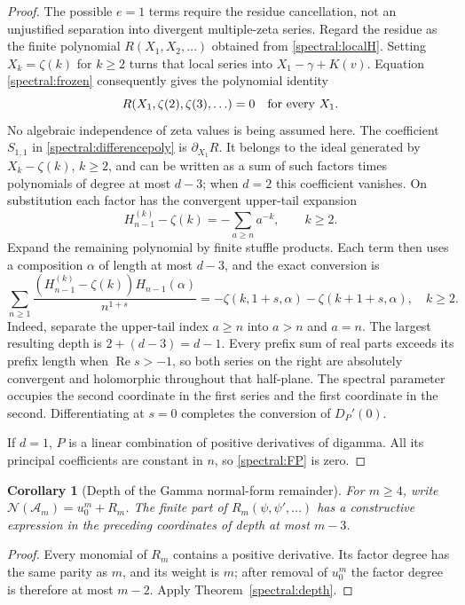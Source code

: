 \documentclass[11pt,a4paper]{article}
\numberwithin{equation}{section}
\newtheorem{corollary}[theorem]{Corollary}
\theoremstyle{definition}
\theoremstyle{remark}
\newcommand{\re}{\operatorname{Re}}
\newcommand{\A}{\mathcal A}
\newcommand{\NN}{\mathcal N}
\begin{document}
\begin{proof}
The possible $e=1$ terms require the residue cancellation, not an
unjustified separation into divergent multiple-zeta series.  Regard the
residue as the finite polynomial $R(X_1,X_2,\ldots)$ obtained from
\eqref{spectral:localH}.  Setting $X_k=\zeta(k)$ for $k\geq2$ turns that
local series into $X_1-\gamma+K(v)$.  Equation
\eqref{spectral:frozen} consequently gives the polynomial identity
\[
 R(X_1,\zeta(2),\zeta(3),\ldots)=0
 \quad\hbox{for every }X_1.
\]
No algebraic independence of zeta values is being assumed here.
The coefficient $S_{1,1}$ in \eqref{spectral:differencepoly} is
$\partial_{X_1}R$.  It belongs to the ideal generated by
$X_k-\zeta(k)$, $k\geq2$, and can be written as a sum of such factors
times polynomials of degree at most $d-3$; when $d=2$ this coefficient
vanishes.  On substitution each factor
has the convergent upper-tail expansion
\[
 H_{n-1}^{(k)}-\zeta(k)=-\sum_{a\geq n}a^{-k},\qquad k\geq2.
\]
Expand the remaining polynomial by finite stuffle products.  Each term
then uses a composition $\alpha$ of length at most $d-3$, and the exact
conversion is
\begin{equation}\label{spectral:tailconversion}
 \boxed{\displaystyle
 \sum_{n\geq1}\frac{(H_{n-1}^{(k)}-\zeta(k))H_{n-1}(\alpha)}{n^{1+s}}
     =-\zeta(k,1+s,\alpha)-\zeta(k+1+s,\alpha),\quad k\geq2.}
\end{equation}
Indeed, separate the upper-tail index $a\geq n$ into $a>n$ and $a=n$.
The largest resulting depth is $2+(d-3)=d-1$.  Every prefix sum of
real parts exceeds its prefix length when $\re s>-1$, so both series
on the right are absolutely convergent and holomorphic throughout that
half-plane.  The spectral parameter occupies the second coordinate in
the first series and the first coordinate in the second.  Differentiating
at $s=0$ completes the conversion of $D_P'(0)$.

If $d=1$, $P$ is a linear combination of positive derivatives of
digamma.  All its principal coefficients are constant in $n$, so
\eqref{spectral:FP} is zero.
\end{proof}

\begin{corollary}[Depth of the Gamma normal-form remainder]
\label{spectral:Gammadepth}
For $m\geq4$, write $\NN(\A_m)=u_0^m+R_m$.  The finite part of
$R_m(\psi,\psi',\ldots)$ has a constructive expression in the preceding
coordinates of depth at most $m-3$.
\end{corollary}

\begin{proof}
Every monomial of $R_m$ contains a positive derivative.  Its factor
degree has the same parity as $m$, and its weight is $m$; after removal
of $u_0^m$ the factor degree is therefore at most $m-2$.  Apply
Theorem~\ref{spectral:depth}.
\end{proof}
\end{document}
